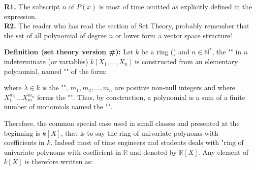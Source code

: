 	\begin{tcolorbox}[title=Remarks,colframe=black,arc=10pt]
	\textbf{R1.} The subscript $n$ of $P (x)$ is most of time omitted as explicitly defined in the expression.\\
	
	\textbf{R2.} The reader who has read the section of Set Theory, probably remember that the set of all polynomial of degree $n$ or lower form a vector space structure!
	\end{tcolorbox}
	\textbf{Definition (set theory version \#\mydef):} Let $k$ be a ring () and $n\in \mathbb{N}^{*}$, the "" in $n$ indeterminate (or variables) $k[X_1,...,X_n]$ is constructed from an elementary polynomial, named "" of the form:
	
	where $\lambda \in k$ is the "", $m_1,m_2,...,m_n$ are positive non-null integers and where $X_1^{m_1}...X_m^{m_n}$ forms the "". Thus, by construction, a polynomial is a sum of a finite number of monomials named the "".
	
	Therefore, the common special case used in small classes and presented at the beginning is $k[X]$, that is to say the ring of univariate polynoms with coefficients in $k$. Indeed most of time engineers and students deals with "ring of univariate polynoms with coefficient in $\mathbb{R}$ and denoted by $\mathbb{R}[X]$. Any element of $k[X]$ is therefore written as:
	
